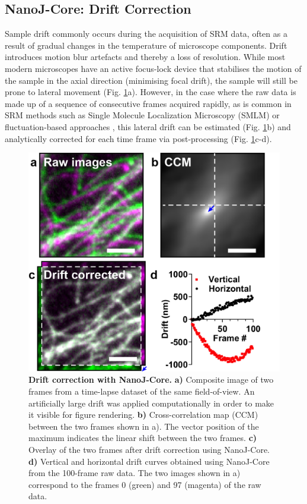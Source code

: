 \subsection*{NanoJ-Core: Drift Correction}
 Sample drift commonly occurs during the acquisition of SRM data, often as a result of gradual changes in the temperature of microscope components. Drift introduces motion blur artefacts and thereby a loss of resolution. While most modern microscopes have an active focus-lock device that stabilises the motion of the sample in the axial direction (minimising focal drift), the sample will still be prone to lateral movement (Fig. \ref{fig:DriftCorrection}a). However, in the case where the raw data is made up of a sequence of consecutive frames acquired rapidly, as is common in SRM methods such as Single Molecule Localization Microscopy (SMLM) \cite{betzig2006imaging,rust2006sub} or fluctuation-based approaches \cite{gustafsson2016fast,dertinger2009fast,cox2012bayesian}, this lateral drift can be estimated (Fig. \ref{fig:DriftCorrection}b) and analytically corrected for each time frame via post-processing (Fig. \ref{fig:DriftCorrection}c-d).
 
 \begin{figure}[!t]
    \centering
    \includegraphics{Figures/FigureDrift_v2.png}
    \caption{\textbf{Drift correction with NanoJ-Core.} \textbf{a)} Composite image of two frames from a time-lapse dataset of the same field-of-view. An artificially large drift was applied computationally in order to make it visible for figure rendering. \textbf{b)} Cross-correlation map (CCM) between the two frames shown in a). The vector position of the maximum indicates the linear shift between the two frames. \textbf{c)} Overlay of the two frames after drift correction using NanoJ-Core. \textbf{d)} Vertical and horizontal drift curves obtained using NanoJ-Core from the 100-frame raw data. The two images shown in a) correspond to the frames 0 (green) and 97 (magenta) of the raw data.}
    \label{fig:DriftCorrection}
 \end{figure}

